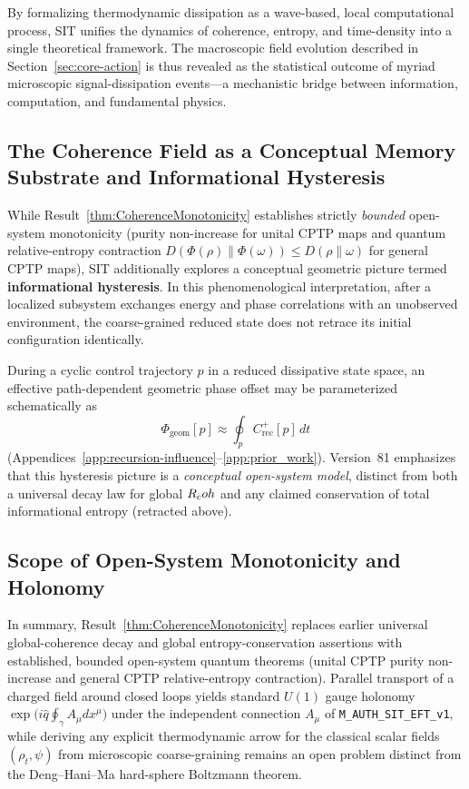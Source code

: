 By formalizing thermodynamic dissipation as a wave-based, local computational process, SIT unifies the dynamics of coherence, entropy, and time-density into a single theoretical framework.
The macroscopic field evolution described in Section~\ref{sec:core-action} is thus revealed as the statistical outcome of myriad microscopic signal-dissipation events---a mechanistic bridge between information, computation, and fundamental physics.

\subsection{The Coherence Field as a Conceptual Memory Substrate and Informational Hysteresis}
\label{sec:hysteresis_memory}
\label{sec:memory_substrate}

While Result~\ref{thm:CoherenceMonotonicity} establishes strictly \emph{bounded} open-system monotonicity (purity non-increase for unital CPTP maps and quantum relative-entropy contraction $D(\Phi(\rho)\|\Phi(\omega)) \le D(\rho\|\omega)$ for general CPTP maps), SIT additionally explores a conceptual geometric picture termed \textbf{informational hysteresis}. In this phenomenological interpretation, after a localized subsystem exchanges energy and phase correlations with an unobserved environment, the coarse-grained reduced state does not retrace its initial configuration identically.

During a cyclic control trajectory $p$ in a reduced dissipative state space, an effective path-dependent geometric phase offset may be parameterized schematically as
\begin{equation}
\Phi_{\mathrm{geom}}[p] \approx \oint_p C_{\mathrm{rec}}^+[p]\,dt
\label{eq:informational_hysteresis_loop}
\end{equation}
(Appendices~\ref{app:recursion-influence}--\ref{app:prior_work}). Version~81 emphasizes that this hysteresis picture is a \emph{conceptual open-system model}, distinct from both a universal decay law for global $R_coh$ and any claimed conservation of total informational entropy (retracted above).

\subsection{Scope of Open-System Monotonicity and Holonomy}

In summary, Result~\ref{thm:CoherenceMonotonicity} replaces earlier universal global-coherence decay and global entropy-conservation assertions with established, bounded open-system quantum theorems (unital CPTP purity non-increase and general CPTP relative-entropy contraction). Parallel transport of a charged field around closed loops yields standard $U(1)$ gauge holonomy $\exp\bigl(i\hat{q}\oint_\gamma A_\mu dx^\mu\bigr)$ under the independent connection $A_\mu$ of \texttt{M\_AUTH\_SIT\_EFT\_v1}, while deriving any explicit thermodynamic arrow for the classical scalar fields $(\rho_t, \psi)$ from microscopic coarse-graining remains an open problem distinct from the Deng--Hani--Ma hard-sphere Boltzmann theorem.

